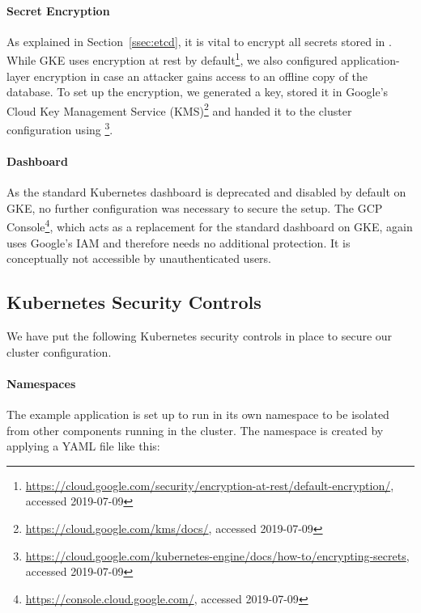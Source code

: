 \paragraph{Secret Encryption}

As explained in Section~\ref{ssec:etcd}, it is vital to encrypt all secrets stored in . While \ac{GKE} uses encryption at rest by default\footnote{\url{https://cloud.google.com/security/encryption-at-rest/default-encryption/}, accessed 2019-07-09}, we also configured application-layer encryption in case an attacker gains access to an offline copy of the  database. To set up the encryption, we generated a key, stored it in Google's Cloud Key Management Service (KMS)\footnote{\url{https://cloud.google.com/kms/docs/}, accessed 2019-07-09} and handed it to the cluster configuration using \footnote{\url{https://cloud.google.com/kubernetes-engine/docs/how-to/encrypting-secrets}, accessed 2019-07-09}.  

\paragraph{Dashboard}

As the standard Kubernetes dashboard is deprecated and disabled by default on \ac{GKE}, no further configuration was necessary to secure the setup. The \ac{GCP} Console\footnote{\url{https://console.cloud.google.com/}, accessed 2019-07-09}, which acts as a replacement for the standard dashboard on \ac{GKE}, again uses Google's \ac{IAM} and therefore needs no additional protection. It is conceptually not accessible by unauthenticated users. 

\subsection{Kubernetes Security Controls} \label{ssec:exaLayer3}

We have put the following Kubernetes security controls in place to secure our cluster configuration.

\paragraph{Namespaces}

The example application is set up to run in its own namespace  to be isolated from other components running in the cluster. The namespace is created by applying a YAML file like this:

